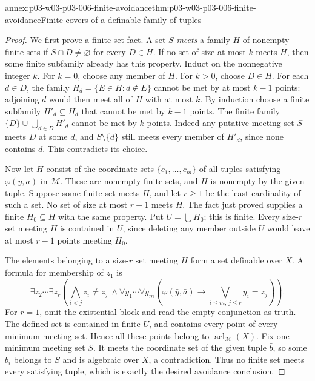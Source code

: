 \begin{annexitem}{annex:p03-w03-p03-006-finite-avoidance}{thm:p03-w03-p03-006-finite-avoidance}{Finite covers of a definable family of tuples}
\begin{proof}
We first prove a finite-set fact. A set \(S\) \emph{meets} a family
\(H\) of nonempty finite sets if \(S\cap D\neq\varnothing\) for
every \(D\in H\). If no set of size at most \(k\) meets \(H\), then
some finite subfamily already has this property. Induct on the
nonnegative integer \(k\). For \(k=0\), choose any member of \(H\).
For \(k>0\), choose \(D\in H\). For each \(d\in D\), the family
\(H_d=\{E\in H:d\notin E\}\) cannot be met by at most \(k-1\)
points: adjoining \(d\) would then meet all of \(H\) with at most
\(k\). By induction choose a finite subfamily \(H'_d\subseteq H_d\)
that cannot be met by \(k-1\) points. The finite family
\(\{D\}\cup\bigcup_{d\in D}H'_d\) cannot be met by \(k\) points.
Indeed any putative meeting set \(S\) meets \(D\) at some \(d\), and
\(S\setminus\{d\}\) still meets every member of \(H'_d\), since
none contains \(d\). This contradicts its choice.

Now let \(H\) consist of the coordinate sets
\(\{c_1,\ldots,c_m\}\) of all tuples satisfying
\(\varphi(\bar y,\bar a)\) in \(\mathcal M\). These are nonempty
finite sets, and \(H\) is nonempty by the given tuple. Suppose some
finite set meets \(H\), and let \(r\geq1\) be the least cardinality
of such a set. No set of size at most \(r-1\) meets \(H\). The fact
just proved supplies a finite \(H_0\subseteq H\) with the same
property. Put \(U=\bigcup H_0\); this is finite. Every size-\(r\)
set meeting \(H\) is contained in \(U\), since deleting any member
outside \(U\) would leave at most \(r-1\) points meeting \(H_0\).

The elements belonging to a size-\(r\) set meeting \(H\) form a set
definable over \(X\). A formula for membership of \(z_1\) is
\[
 \exists z_2\cdots\exists z_r\left(
   \bigwedge_{i<j}z_i\neq z_j\ \land
   \forall y_1\cdots\forall y_m
   \left(\varphi(\bar y,\bar a)\to
                  \bigvee_{i\leq m,\,j\leq r}y_i=z_j\right)
                                      \right).
\]
For \(r=1\), omit the existential block and read the empty conjunction
as truth. The defined set is contained in finite \(U\), and contains
every point of every minimum meeting set. Hence all these points belong
to \(\operatorname{acl}_{\mathcal M}(X)\). Fix one minimum meeting
set \(S\). It meets the coordinate set of the given tuple \(\bar b\),
so some \(b_i\) belongs to \(S\) and is algebraic over \(X\), a
contradiction. Thus no finite set meets every satisfying tuple, which is
exactly the desired avoidance conclusion.
\end{proof}
\end{annexitem}

